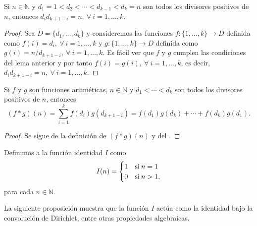 \begin{lemma}\label{lemma:div1}
Si $n\in\mathbb{N}$ y $d_1=1<d_2<\cdots<d_{k-1}<d_k=n$ son todos los divisores positivos de $n$, entonces $d_i d_{k+1-i}=n,\:\forall \: i=1,\ldots,k$.
\end{lemma}
\begin{proof}
Sea $D=\{d_1,\ldots,d_k\}$ y consideremos las funciones $f: \{1,\ldots,k\} \longrightarrow D$ definida como $f(i)=d_i,\:\forall \: i=1,\ldots,k$ y $g: \{1,\ldots,k\} \longrightarrow D$ definida como $g(i)=n/d_{k+1-i},\:\forall \: i=1,\ldots,k$. Es fácil ver que $f$ y $g$ cumplen las condiciones del lema anterior y por tanto $f(i)=g(i),\:\forall \: i=1,\ldots,k$, es decir, $d_i d_{k+1-i}=n,\:\forall \: i=1,\ldots,k$.
\end{proof}

\begin{proposition}\label{prop:dir1}
Si $f$ y $g$ son funciones aritméticas, $n\in\mathbb{N}$ y $d_1<\cdots<d_k$ son todos los divisores positivos de $n$, entonces 
\begin{equation*}
	(f*g)(n)=\sum_{i=1}^{k} f(d_i)g(d_{k+1-i})=f(d_1)g(d_k)+\cdots+f(d_k)g(d_1).
\end{equation*}
\begin{proof}
Se sigue de la definición de $(f*g)(n)$ y del .
\end{proof}
\end{proposition}

\begin{definition}\label{def:str2}
Definimos a la función identidad $I$ como
\begin{equation*}
	I(n) =
		\begin{cases}
			\hfil 1 & \text{si} \: n=1 \\ 
			\hfil 0 & \text{si} \: n>1,
		\end{cases}
\end{equation*}
para cada $n\in\mathbb{N}$.
\end{definition}

La siguiente proposición muestra que la función $I$ actúa como la identidad bajo la convolución de Dirichlet, entre otras propiedades algebraicas.

